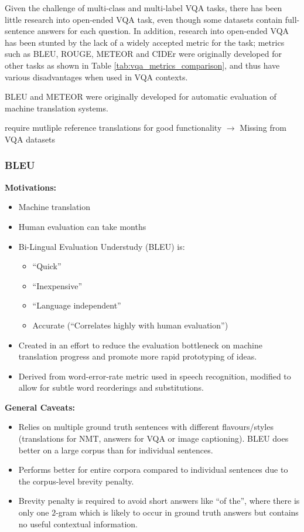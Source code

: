 Given the challenge of multi-class and multi-label VQA tasks, there has been little research into open-ended VQA task, even though some datasets contain full-sentence answers for each question. In addition, research into open-ended VQA has been stunted by the lack of a widely accepted metric for the task; metrics such as BLEU,  ROUGE, METEOR and CIDEr were originally developed for other tasks as shown in Table \ref{tab:vqa_metrics_comparison}, and thus have various disadvantages when used in VQA contexts.

BLEU and METEOR were originally developed for automatic evaluation of machine translation systems.

{\color{red} require mutliple reference translations for good functionality \(\rightarrow\) Missing from VQA datasets}

\subsubsection{BLEU}

\textbf{Motivations:}

\begin{itemize}
    \item Machine translation
    \item Human evaluation can take months
    \item Bi-Lingual Evaluation Understudy (BLEU) is:
    \begin{itemize}
        \item ``Quick''
        \item ``Inexpensive''
        \item ``Language independent''
        \item Accurate (``Correlates highly with human evaluation'')
    \end{itemize}
    \item Created in an effort to reduce the evaluation bottleneck on machine translation progress and promote more rapid prototyping of ideas.
    \item Derived from word-error-rate metric used in speech recognition, modified to allow for subtle word reorderings and substitutions.
\end{itemize}


\textbf{General Caveats:}

\begin{itemize}
    \item Relies on multiple ground truth sentences with different flavours/styles (translations for NMT, answers for VQA or image captioning). BLEU does better on a large corpus than for individual sentences.
    \item Performs better for entire corpora compared to individual sentences due to the corpus-level brevity penalty.
    \item Brevity penalty is required to avoid short answers like ``of the'', where there is only one \(2\)-gram which is likely to occur in ground truth answers but contains no useful contextual information.
\end{itemize}


